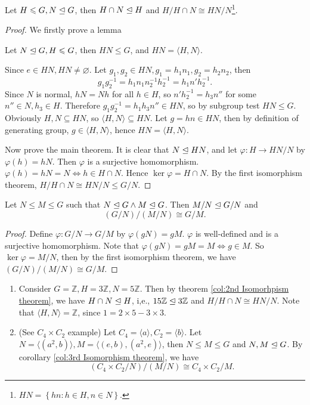 \documentclass[a4paper]{article}
\begin{document}
    \begin{corollary}\label{col:2nd Isomorhpism theorem}
            Let $ H\leqslant G, N \trianglelefteq G $, then $ H \cap N \trianglelefteq H $ and $ H/H \cap N \cong HN/N $\footnote{$ HN=\left\{ hn:h\in H, n\in N\right\} $.}.
    \end{corollary}
    \begin{proof}
        We firstly prove a lemma 
        \begin{lemma}
            Let $ N \trianglelefteq G, H\leqslant G $, then $HN\le G$, and $ HN=\langle H,N \rangle $.
        \end{lemma}
        Since $ e\in HN, HN\neq \varnothing $. Let $ g_1,g_2\in HN, g_1=h_1n_1, g_2=h_2n_2 $, then
        \[
            g_1g_2^{-1}=h_1n_1 n_2^{-1}h_2^{-1}=h_1n'h_2^{-1}
        .\]
        Since $N$ is normal, $hN=Nh$ for all $h\in H$, so $ n'h_2^{-1}=h_3n'' $ for some $n''\in N, h_3\in H$. Therefore $ g_1g_2^{-1}=h_1h_3n''\in HN $, so by subgroup test $ HN\le G $. Obviously $ H,N \subseteq HN $, so $ \langle H,N \rangle \subseteq HN $. Let $ g=hn\in HN $, then by definition of generating group, $ g\in \langle H,N \rangle $, hence $ HN=\langle H,N \rangle $.

        Now prove the main theorem. It is clear that $ N \trianglelefteq HN $, and let $ \varphi: H\to HN/N $ by $ \varphi(h)=hN $. Then $ \varphi $ is a surjective homomorphism. $ \varphi(h)=hN=N \Leftrightarrow h\in H\cap N $. Hence $ \ker \varphi=H \cap N $. By the first isomorphism theorem, $ H/H\cap N \cong HN/N \le G/N $.
    \end{proof}
    \begin{corollary}\label{col:3rd Isomorphism theorem}
            Let $ N \le M \le G $ such that $ N \trianglelefteq G \land M \trianglelefteq G $. Then $ M /N \trianglelefteq G/N $ and 
            \[
                (G/N)/(M/N) \cong G/M
            .\]
    \end{corollary}
    \begin{proof}
        Define $ \varphi:G/N \to G/M $ by $ \varphi(gN)=gM $. $ \varphi $ is well-defined and is a surjective homomorphism. Note that $ \varphi(gN)=gM=M \Leftrightarrow g\in M $. So $ \ker \varphi=M/N $, then by the first isomorphism theorem, we have $ (G/N)/(M/N) \cong G/M $.
    \end{proof}
    \begin{example}
        \begin{enumerate}
            \item Consider $ G= \mathbb{Z} ,H=3\mathbb{Z}, N=5\mathbb{Z} $. Then by theorem \ref{col:2nd Isomorhpism theorem}, we have $ H \cap N \trianglelefteq H $, i,e., $ 15\mathbb{Z} \trianglelefteq 3\mathbb{Z} $ and $ H/H\cap N \cong HN/N $. Note that $ \langle H,N \rangle =\mathbb{Z} $, since $1=2\times 5-3\times 3$.
            \item (See $ C_4 \times C_2 $ example) Let $ C_4=\langle a \rangle , C_2=\langle b \rangle $. Let $ N=\langle (a^2,b) \rangle, M=\langle (e,b),(a^2,e) \rangle $, then $ N \le M\le G $ and $ N,M \trianglelefteq G $. By corollary \ref{col:3rd Isomorphism theorem}, we have 
            \[
                (C_4 \times C_2 / N)/ (M/N)\cong C_4 \times C_2 / M
            .\]
        \end{enumerate}
    \end{example}
\end{document}
